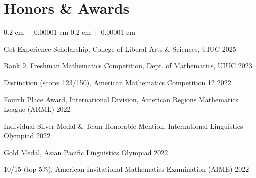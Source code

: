 \documentclass[10pt, letterpaper]{article}
\newenvironment{onecolentry}{
    \begin{adjustwidth}{
        0.2 cm + 0.00001 cm
    }{
        0.2 cm + 0.00001 cm
    }
}{
    \end{adjustwidth}
} %
\begin{document}
    \section{Honors \& Awards}
        \begin{onecolentry}
        \begingroup \setlength{\parskip}{2.5pt} \vspace*{-\parskip}
            Get Experience Scholarship, College of Liberal Arts \& Sciences, UIUC \hfill 2025

            Rank 9, Freshman Mathematics Competition, Dept. of Mathematics, UIUC \hfill 2023

            Distinction (score: 123{\footnotesize /150}), American Mathematics Competition 12 \hfill 2022

            Fourth Place Award, International Division, American Regions Mathematics League (ARML) \hfill 2022

            Individual Silver Medal \& Team Honorable Mention, International Linguistics Olympiad \hfill 2022

            Gold Medal, Asian Pacific Linguistics Olympiad \hfill 2022

            10{\footnotesize /15} (top 5\%), American Invitational Mathematics Examination (AIME) \hfill 2022
        \endgroup
        \end{onecolentry}
\end{document}
